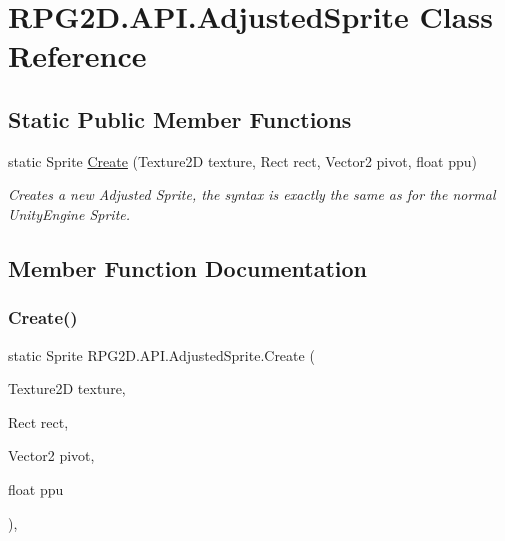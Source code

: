 \hypertarget{class_r_p_g2_d_1_1_a_p_i_1_1_adjusted_sprite}{}\section{R\+P\+G2\+D.\+A\+P\+I.\+Adjusted\+Sprite Class Reference}
\label{class_r_p_g2_d_1_1_a_p_i_1_1_adjusted_sprite}
\subsection*{Static Public Member Functions}
\begin{DoxyCompactItemize}
\item 
static Sprite \mbox{\hyperlink{class_r_p_g2_d_1_1_a_p_i_1_1_adjusted_sprite_a4aa452347705855c021fe3ef81689922}{Create}} (Texture2D texture, Rect rect, Vector2 pivot, float ppu)
\begin{DoxyCompactList}\small\item\em Creates a new Adjusted Sprite, the syntax is exactly the same as for the normal Unity\+Engine Sprite. \end{DoxyCompactList}\end{DoxyCompactItemize}


\subsection{Member Function Documentation}
\mbox{\label{class_r_p_g2_d_1_1_a_p_i_1_1_adjusted_sprite_a4aa452347705855c021fe3ef81689922}} 
\subsubsection{\texorpdfstring{Create()}{Create()}}
{\footnotesize\ttfamily static Sprite R\+P\+G2\+D.\+A\+P\+I.\+Adjusted\+Sprite.\+Create (\begin{DoxyParamCaption}\item[{Texture2D}]{texture,  }\item[{Rect}]{rect,  }\item[{Vector2}]{pivot,  }\item[{float}]{ppu }\end{DoxyParamCaption})\hspace{0.3cm}{\ttfamily [inline]}, {\ttfamily [static]}}




